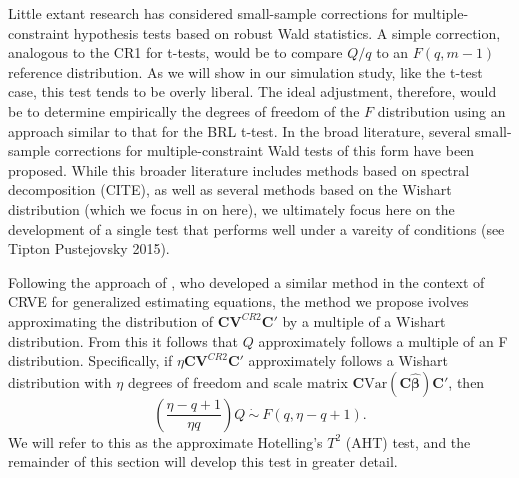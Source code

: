 \documentclass[12pt]{article}\usepackage[]{graphicx}\usepackage[]{color}
\newcommand{\Var}{\text{Var}}
\newcommand{\bm}{\mathbf}
\newcommand{\bs}{\boldsymbol}
\begin{document}
Little extant research has considered small-sample corrections for multiple-constraint hypothesis tests based on robust Wald statistics.
A simple correction, analogous to the CR1 for t-tests, would be to compare $Q / q$ to an $F(q, m - 1)$ reference distribution. 
As we will show in our simulation study, like the t-test case, this test tends to be overly liberal. 
The ideal adjustment, therefore, would be to determine empirically the degrees of freedom of the $F$ distribution using an approach similar to that for the BRL t-test. In the broad literature, several small-sample corrections for multiple-constraint Wald tests of this form have been proposed. 
While this broader literature includes methods based on spectral decomposition (CITE), as well as several methods based on the Wishart distribution (which we focus in on here), we ultimately focus here on the development of a single test that performs well under a vareity of conditions (see Tipton Pustejovsky 2015). 

Following the approach of \cite{Pan2002small}, who developed a similar method in the context of CRVE for generalized estimating equations, the method we propose ivolves approximating the distribution of $\bm{C}\bm{V}^{CR2} \bm{C}'$ by a multiple of a Wishart distribution. From this it follows that $Q$ approximately follows a multiple of an F distribution. Specifically, if $\eta \bm{C}\bm{V}^{CR2} \bm{C}'$ approximately follows a Wishart distribution with $\eta$ degrees of freedom and scale matrix $\bm{C} \Var\left(\bm{C}\bs{\hat\beta}\right)\bm{C}'$, then 
\begin{equation}
\label{eq:AHT}
\left(\frac{\eta - q + 1}{\eta q}\right) Q \ \dot\sim \ F(q, \eta - q + 1).
\end{equation}
We will refer to this as the approximate Hotelling's $T^2$ (AHT) test, and the remainder of this section will develop this test in greater detail.
\end{document}
